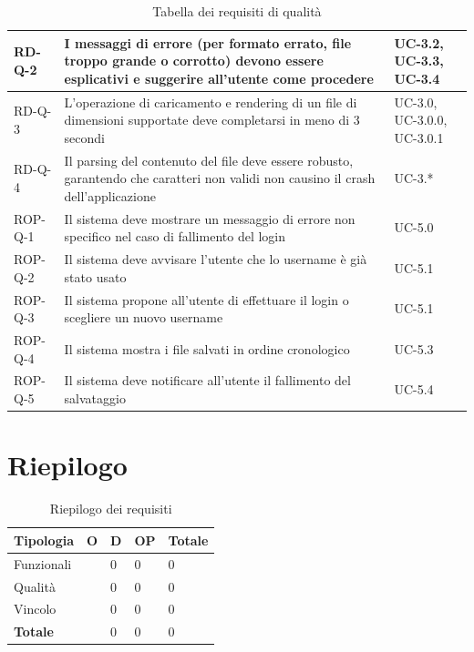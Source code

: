 \documentclass[11pt,a4paper]{article}
\begin{document}
\begin{table}[H]
\begin{tabular}{|p{}|>{\raggedright\arraybackslash}p{}|p{}|}
\hline
RD-Q-2 & I messaggi di errore (per formato errato, file troppo grande o corrotto) devono essere esplicativi e suggerire all'utente come procedere & UC-3.2, UC-3.3, UC-3.4 \\
\hline
RD-Q-3 & L'operazione di caricamento e rendering di un file di dimensioni supportate deve completarsi in meno di 3 secondi & UC-3.0, UC-3.0.0, UC-3.0.1 \\
\hline
RD-Q-4 & Il parsing del contenuto del file deve essere robusto, garantendo che caratteri non validi non causino il crash dell'applicazione & UC-3.* \\
\hline
ROP-Q-1 & Il sistema deve mostrare un messaggio di errore non specifico nel caso di fallimento del login & UC-5.0 \\
\hline
ROP-Q-2 & Il sistema deve avvisare l'utente che lo username è già stato usato & UC-5.1 \\
\hline
ROP-Q-3 & Il sistema propone all'utente di effettuare il login o scegliere un nuovo username & UC-5.1 \\
\hline
ROP-Q-4 & Il sistema mostra i file salvati in ordine cronologico & UC-5.3 \\
\hline
ROP-Q-5 & Il sistema deve notificare all'utente il fallimento del salvataggio & UC-5.4 \\
\hline
\end{tabular}
\caption{Tabella dei requisiti di qualità}
\end{table}

\newpage

\section{Riepilogo}
\begin{table}[H]
\centering
\begin{tabular}{|p{}|>{\raggedright\arraybackslash}p{}|p{}|p{}|p{}|}
\hline
\textbf{Tipologia} & \textbf{O} & \textbf{D} & \textbf{OP} & \textbf{Totale}\\
\hline
Funzionali & 0 & 0 & 0 & 0 \\
\hline
Qualità & 0 & 0 & 0 & 0 \\
\hline
Vincolo & 0 & 0 & 0 & 0 \\
\hline
\textbf{Totale} & 0 & 0 & 0 & 0\\
\hline
\end{tabular}
\caption{Riepilogo dei requisiti}
\end{table}
\end{document}
